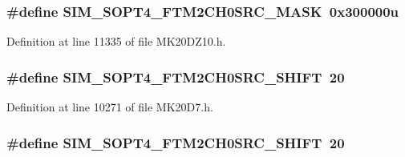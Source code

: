 \subsubsection[{\texorpdfstring{S\+I\+M\+\_\+\+S\+O\+P\+T4\+\_\+\+F\+T\+M2\+C\+H0\+S\+R\+C\+\_\+\+M\+A\+SK}{SIM_SOPT4_FTM2CH0SRC_MASK}}]{\setlength{\rightskip}{0pt plus 5cm}\#define S\+I\+M\+\_\+\+S\+O\+P\+T4\+\_\+\+F\+T\+M2\+C\+H0\+S\+R\+C\+\_\+\+M\+A\+SK~0x300000u}\hypertarget{group___s_i_m___register___masks_ga0dcacc22852e0ee0a7a853a51b422b70}{}\label{group___s_i_m___register___masks_ga0dcacc22852e0ee0a7a853a51b422b70}


Definition at line 11335 of file M\+K20\+D\+Z10.\+h.

\subsubsection[{\texorpdfstring{S\+I\+M\+\_\+\+S\+O\+P\+T4\+\_\+\+F\+T\+M2\+C\+H0\+S\+R\+C\+\_\+\+S\+H\+I\+FT}{SIM_SOPT4_FTM2CH0SRC_SHIFT}}]{\setlength{\rightskip}{0pt plus 5cm}\#define S\+I\+M\+\_\+\+S\+O\+P\+T4\+\_\+\+F\+T\+M2\+C\+H0\+S\+R\+C\+\_\+\+S\+H\+I\+FT~20}\hypertarget{group___s_i_m___register___masks_ga04d4aa6612f4d2df7d9e0e85f15f6dd6}{}\label{group___s_i_m___register___masks_ga04d4aa6612f4d2df7d9e0e85f15f6dd6}


Definition at line 10271 of file M\+K20\+D7.\+h.

\subsubsection[{\texorpdfstring{S\+I\+M\+\_\+\+S\+O\+P\+T4\+\_\+\+F\+T\+M2\+C\+H0\+S\+R\+C\+\_\+\+S\+H\+I\+FT}{SIM_SOPT4_FTM2CH0SRC_SHIFT}}]{\setlength{\rightskip}{0pt plus 5cm}\#define S\+I\+M\+\_\+\+S\+O\+P\+T4\+\_\+\+F\+T\+M2\+C\+H0\+S\+R\+C\+\_\+\+S\+H\+I\+FT~20}\hypertarget{group___s_i_m___register___masks_ga04d4aa6612f4d2df7d9e0e85f15f6dd6}{}\label{group___s_i_m___register___masks_ga04d4aa6612f4d2df7d9e0e85f15f6dd6}


